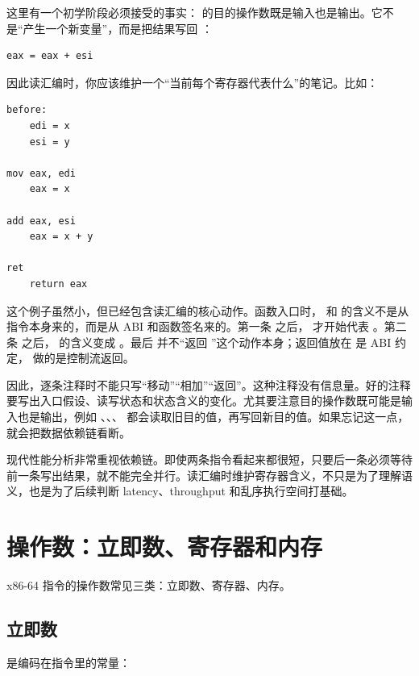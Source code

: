 这里有一个初学阶段必须接受的事实： 的目的操作数既是输入也是输出。它不是“产生一个新变量”，而是把结果写回 ：

\begin{lstlisting}
eax = eax + esi
\end{lstlisting}

因此读汇编时，你应该维护一个“当前每个寄存器代表什么”的笔记。比如：

\begin{lstlisting}
before:
    edi = x
    esi = y

mov eax, edi
    eax = x

add eax, esi
    eax = x + y

ret
    return eax
\end{lstlisting}

这个例子虽然小，但已经包含读汇编的核心动作。函数入口时， 和  的含义不是从指令本身来的，而是从 ABI 和函数签名来的。第一条  之后， 才开始代表 。第二条  之后， 的含义变成 。最后  并不“返回 ”这个动作本身；返回值放在  是 ABI 约定， 做的是控制流返回。

因此，逐条注释时不能只写“移动”“相加”“返回”。这种注释没有信息量。好的注释要写出入口假设、读写状态和状态含义的变化。尤其要注意目的操作数既可能是输入也是输出，例如 、、、 都会读取旧目的值，再写回新目的值。如果忘记这一点，就会把数据依赖链看断。

\begin{deepdive}
现代性能分析非常重视依赖链。即使两条指令看起来都很短，只要后一条必须等待前一条写出结果，就不能完全并行。读汇编时维护寄存器含义，不只是为了理解语义，也是为了后续判断 latency、throughput 和乱序执行空间打基础。
\end{deepdive}

\section{操作数：立即数、寄存器和内存}

x86-64 指令的操作数常见三类：立即数、寄存器、内存。

\subsection{立即数}

 是编码在指令里的常量：

